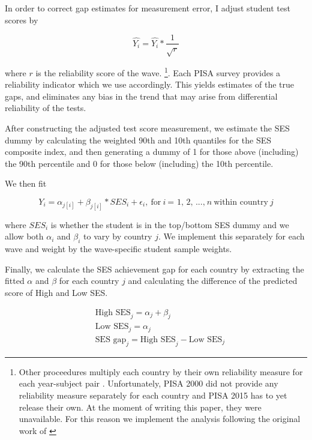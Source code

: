 \documentclass[11pt, a4paper]{article}\usepackage[]{graphicx}\usepackage[]{color}
\begin{document}
In order to correct gap estimates for measurement error, I adjust student test scores by

\begin{equation}
\hat{Y_i} = \hat{Y_i} * \frac{1}{\sqrt{r}}
\end{equation}

where \begin{math}r\end{math} is the reliability score of the wave. \footnote{Other proceedures multiply each country by their own reliability measure for each year-subject pair \citep{anna2016_global}. Unfortunately, PISA 2000 did not provide any reliability measure separately for each country and PISA 2015 has to yet release their own. At the moment of writing this paper, they were unavailable. For this reason we implement the analysis following the original work of \citet{reardon2011}}. Each PISA survey provides a reliability indicator which we use accordingly. This yields estimates of the true gaps, and eliminates any bias in the trend that may arise from differential reliability of the tests.

After constructing the adjusted test score measurement, we estimate the SES dummy by calculating the weighted 90th and 10th quantiles for the SES composite index, and then generating a dummy of 1 for those above (including) the 90th percentile and 0 for those below (including) the 10th percentile.

We then fit

\begin{equation}
Y_i = \alpha_{j[i]} + \beta_{j[i]} * SES_i + \epsilon_i,\ \text{for} \ i \ \text{= 1, 2, ...,} \ n \ \text{within country} \ j
\end{equation}


where \(SES_i\) is whether the student is in the top/bottom SES dummy and we allow both \(\alpha_i\) and \(\beta_i\) to vary by country \(j\). We implement this separately for each wave and weight by the wave-specific student sample weights.

Finally, we calculate the SES achievement gap for each country by extracting the fitted \(\alpha\) and \(\beta\) for each country \(j\) and calculating the difference of the predicted score of High and Low SES.

\begin{equation}
\begin{split}
\quad \text{High SES}_j = \alpha_j + \beta_j \\
\quad \text{Low SES}_j = \alpha_j \\
\quad \text{SES gap}_j = \text{High SES}_j - \text{Low SES}_j
\end{split}
\end{equation}
\end{document}
